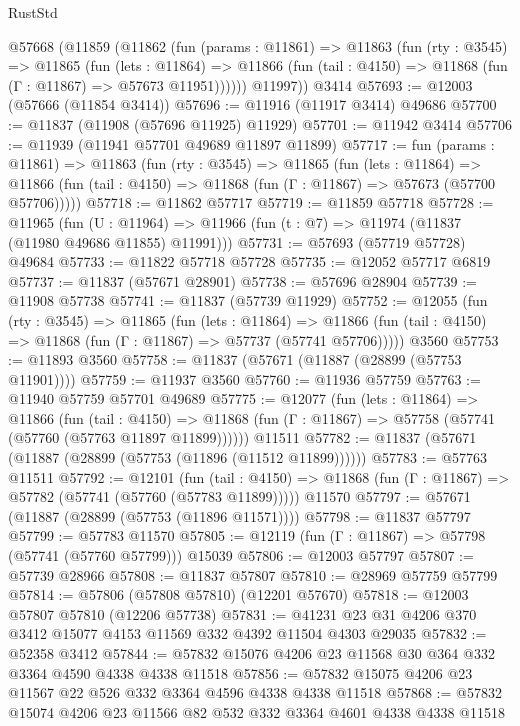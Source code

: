 \begin{lexlean}{RustStd}
\begin{coremodule}
    @57668
      (@11859
        (@11862
          (fun (params : @11861) =>
          @11863
            (fun (rty : @3545) =>
            @11865
              (fun (lets : @11864) =>
              @11866 (fun (tail : @4150) => @11868 (fun (Γ : @11867) => @57673 @11951))))))
        @11997))
    @3414
@57693 := @12003 (@57666 (@11854 @3414))
@57696 := @11916 (@11917 @3414) @49686
@57700 := @11837 (@11908 (@57696 @11925) @11929)
@57701 := @11942 @3414
@57706 := @11939 (@11941 @57701 @49689 @11897 @11899)
@57717 := fun (params : @11861) =>
  @11863
    (fun (rty : @3545) =>
    @11865
      (fun (lets : @11864) =>
      @11866 (fun (tail : @4150) => @11868 (fun (Γ : @11867) => @57673 (@57700 @57706)))))
@57718 := @11862 @57717
@57719 := @11859 @57718
@57728 := @11965
    (fun (U : @11964) => @11966 (fun (t : @7) => @11974 (@11837 (@11980 @49686 @11855) @11991)))
@57731 := @57693 (@57719 @57728) @49684
@57733 := @11822 @57718 @57728
@57735 := @12052 @57717 @6819
@57737 := @11837 (@57671 @28901)
@57738 := @57696 @28904
@57739 := @11908 @57738
@57741 := @11837 (@57739 @11929)
@57752 := @12055
    (fun (rty : @3545) =>
    @11865
      (fun (lets : @11864) =>
      @11866 (fun (tail : @4150) => @11868 (fun (Γ : @11867) => @57737 (@57741 @57706)))))
    @3560
@57753 := @11893 @3560
@57758 := @11837 (@57671 (@11887 (@28899 (@57753 @11901))))
@57759 := @11937 @3560
@57760 := @11936 @57759
@57763 := @11940 @57759 @57701 @49689
@57775 := @12077
    (fun (lets : @11864) =>
    @11866
      (fun (tail : @4150) =>
      @11868 (fun (Γ : @11867) => @57758 (@57741 (@57760 (@57763 @11897 @11899))))))
    @11511
@57782 := @11837 (@57671 (@11887 (@28899 (@57753 (@11896 (@11512 @11899))))))
@57783 := @57763 @11511
@57792 := @12101
    (fun (tail : @4150) => @11868 (fun (Γ : @11867) => @57782 (@57741 (@57760 (@57783 @11899)))))
    @11570
@57797 := @57671 (@11887 (@28899 (@57753 (@11896 @11571))))
@57798 := @11837 @57797
@57799 := @57783 @11570
@57805 := @12119 (fun (Γ : @11867) => @57798 (@57741 (@57760 @57799))) @15039
@57806 := @12003 @57797
@57807 := @57739 @28966
@57808 := @11837 @57807
@57810 := @28969 @57759 @57799
@57814 := @57806 (@57808 @57810) (@12201 @57670)
@57818 := @12003 @57807 @57810 (@12206 @57738)
@57831 := @41231 @23 @31 @4206 @370 @3412 @15077 @4153 @11569 @332 @4392 @11504 @4303 @29035
@57832 := @52358 @3412
@57844 := @57832 @15076 @4206 @23 @11568 @30 @364 @332 @3364 @4590 @4338 @4338 @11518
@57856 := @57832 @15075 @4206 @23 @11567 @22 @526 @332 @3364 @4596 @4338 @4338 @11518
@57868 := @57832 @15074 @4206 @23 @11566 @82 @532 @332 @3364 @4601 @4338 @4338 @11518

\end{coremodule}
\end{lexlean}
